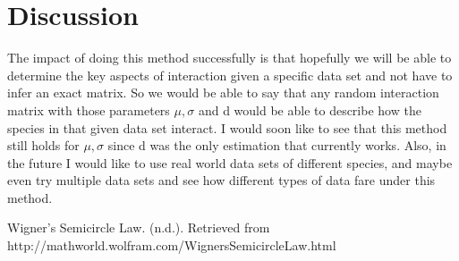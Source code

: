 \documentclass{article}
\newcommand{\D}{\displaystyle}
\begin{document}
\hfill\break
%





\section{Discussion}
The impact of doing this method successfully is that hopefully we will be able to determine the key aspects of interaction given a specific data set and not have to infer an exact matrix. So we would be able to say that any random interaction matrix with those parameters $\mu, \sigma$ and d would be able to describe how the species in that given data set interact. I would soon like to see that this method still holds for $\mu, \sigma$ since d was the only estimation that currently works. Also, in the future I would like to use real world data sets of different species, and maybe even try multiple data sets and see how different types of data fare under this method. 

\hfill\break


\begin{thebibliography}{999}

 Wigner's Semicircle Law. (n.d.). Retrieved from http://mathworld.wolfram.com/WignersSemicircleLaw.html


\end{thebibliography}
\end{document}
